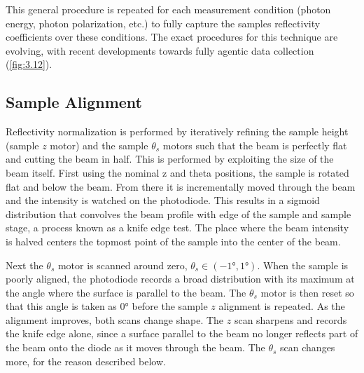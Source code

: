 This general procedure is repeated for each measurement condition (photon energy, photon polarization, etc.) to fully capture the samples reflectivity coefficients over these conditions. The exact procedures for this technique are evolving, with recent developments towards fully agentic data collection (\cref{fig:3.12}).

\subsection{Sample Alignment}\label{sec:sample-alignment}

Reflectivity normalization is performed by iteratively refining the sample height (sample \(z\) motor) and the sample \(\theta_{s}\) motors such that the beam is perfectly flat and cutting the beam in half. This is performed by exploiting the size of the beam itself. First using the nominal z and theta positions, the sample is rotated flat and below the beam. From there it is incrementally moved through the beam and the intensity is watched on the photodiode. This results in a sigmoid distribution that convolves the beam profile with edge of the sample and sample stage, a process known as a knife edge test. The place where the beam intensity is halved centers the topmost point of the sample into the center of the beam.

Next the \(\theta_{s}\) motor is scanned around zero, \(\theta_{s} \in (\ang{-1}, \ang{1})\). When the sample is poorly aligned, the photodiode records a broad distribution with its maximum at the angle where the surface is parallel to the beam. The \(\theta_{s}\) motor is then reset so that this angle is taken as \ang{0} before the sample \(z\) alignment is repeated. As the alignment improves, both scans change shape. The \(z\) scan sharpens and records the knife edge alone, since a surface parallel to the beam no longer reflects part of the beam onto the diode as it moves through the beam. The \(\theta_{s}\) scan changes more, for the reason described below.

